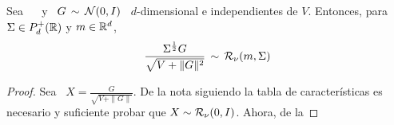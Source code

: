 %
\begin{lema}\label{Lem:MP:StudentRGamma}
%
  Sea \  \
  y  \   $G  \,  \sim  \,   \mathcal{N}(0,I)$  \  $d$-dimensional   e  independientes  de
  $V$. Entonces, para $\Sigma \in P_d^+(\mathbb{R})$ y $m \in \mathbb{R}^d$,
  \[
  \frac{\Sigma^{\frac12} G}{\sqrt{V + \|G\|^2}} \, \sim \, \mathcal{R}_\nu( m , \Sigma )
  \]
\end{lema}
\begin{proof}
  Sea \ $X = \frac{G}{\sqrt{V + \|G\|}}$. De la nota siguiendo la tabla de caracter\'isticas
  es  necesario  y suficiente  probar  que $X  \sim  \mathcal{R}_\nu(0,I)$.  Ahora, de  la
\end{proof}
